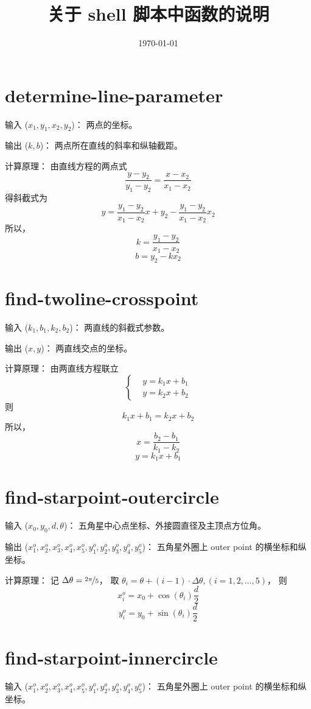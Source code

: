 \documentclass[UTF8]{ctexart}
\title{关于 shell 脚本中函数的说明}
\author{}
\date{\today}
\begin{document}
\maketitle

\section{determine-line-parameter}
输入 ($x_1, y_1, x_2, y_2$)：
两点的坐标。

输出 ($k, b$)：
两点所在直线的斜率和纵轴截距。

计算原理：
由直线方程的两点式
\[ \frac{y - y_2}{y_1 - y_2} = \frac{x - x_2}{x_1 - x_2} \]
得斜截式为
\[ y = \frac{y_1 - y_2}{x_1 - x_2}x + y_2 - \frac{y_1 - y_2}{x_1 - x_2}x_2 \]
所以，
\[ k = \frac{y_1 - y_2}{x_1 - x_2} \]
\[ b = y_2 - k x_2 \]

\section{find-twoline-crosspoint}
输入 ($k_1, b_1, k_2, b_2$)：
两直线的斜截式参数。

输出 ($x, y$)：
两直线交点的坐标。

计算原理：
由两直线方程联立
\[ \left\{
  \begin{aligned}
    & y = k_1 x + b_1 \\
    & y = k_2 x + b_2
  \end{aligned}
\right. \]
则
\[ k_1 x + b_1 = k_2 x + b_2 \]
所以，
\[ x = \frac{b_2 - b_1}{k_1 - k_2} \]
\[ y = k_1 x + b_1 \]

\section{find-starpoint-outercircle}
输入 ($x_0, y_0, d, \theta$)：
五角星中心点坐标、外接圆直径及主顶点方位角。

输出 ($x_1^o, x_2^o, x_3^o, x_4^o, x_5^o,
y_1^o, y_2^o, y_3^o, y_4^o, y_5^o$)：
五角星外圈上 outer point 的横坐标和纵坐标。

计算原理：
记 $\Delta\theta = \nicefrac{2 \pi}{5}$，
取 $\theta_i = \theta + (i - 1) \cdot \Delta\theta, (i = 1, 2, \ldots, 5)$，
则
\[ x_i^o = x_0 + \cos(\theta_i) \frac{d}{2} \]
\[ y_i^o = y_0 + \sin(\theta_i) \frac{d}{2} \]

\section{find-starpoint-innercircle}
输入 ($x_1^o, x_2^o, x_3^o, x_4^o, x_5^o,
y_1^o, y_2^o, y_3^o, y_4^o, y_5^o$)：
五角星外圈上 outer point 的横坐标和纵坐标。
\end{document}
